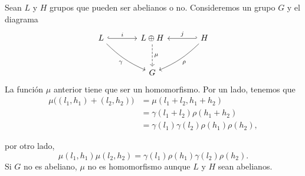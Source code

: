 \begin{ejemplo}
Sean $L$ y $H$ grupos que pueden ser abelianos o no. Consideremos un grupo $G$ y el diagrama
\[
\begin{tikzcd}[row sep=large, column sep=large]
L \arrow[r, "i", hook] \arrow[dr, "\gamma"', bend right=10] & L \oplus H \arrow[d, "\mu", dashed] & H \arrow[l, "j"', hook'] \arrow[dl, "\rho", bend left=10] \\
& G &
\end{tikzcd}
\]
La función $\mu$ anterior tiene que ser un homomorfismo. Por un lado, tenemos que
\begin{align*}
    \mu\big((l_1, h_1) + (l_2, h_2)\big) &= \mu(l_1 + l_2, h_1 + h_2) \\
    &= \gamma(l_1 + l_2)\rho(h_1 + h_2) \\
    &={\gamma(l_1)\gamma(l_2)\rho(h_1)\rho(h_2)},    
\end{align*}

por otro lado,
\[
\mu(l_1, h_1)\mu(l_2, h_2) = {\gamma(l_1)\rho(h_1)\gamma(l_2)\rho(h_2)}.
\]
Si $G$ no es abeliano, $\mu$ no es homomorfismo aunque $L$ y $H$ sean abelianos.
\end{ejemplo}


